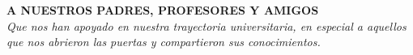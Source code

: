 \chapter*{}
\thispagestyle{empty}
\begin{flushright}
	\vfill
	\textbf{A NUESTROS PADRES, PROFESORES Y AMIGOS}\\
	\textit{Que nos han apoyado en nuestra trayectoria universitaria, en especial a aquellos\\ que nos abrieron las puertas y compartieron sus conocimientos.}
	\vfill
\end{flushright}

\begin{comment}


\chapter*{Agradecimientos}
\vskip 1cm

\paragraph{Nuestros Padres}

Por su amor, trabajo y sacrificio en todos estos años, gracias a ustedes hemos logrado llegar hasta aquí y convertirnos en lo que somos. Ha sido un orgullo y privilegio ser sus hijos, son los mejores padres.
\newline

\paragraph{Dra. Anamim V. Wong.}

Asesora de tesis, deseamos reconocer su valiosa guía, trabajo y dedicación permanente y continua al presente trabajo, así como sus sugerencias y observaciones, siempre inteligentes y oportunas.
\newline

\paragraph{Dra. Jehiely Belem H. C.  \& Ing. Rosel Muñoz López}

Por todas sus aportaciones para el desarrollo de esta tesis, así como reconocer todos los conocimientos que han logrado transmitirnos en las innumerables horas que hemos pasado juntos trabajando en los últimos años, siempre les estaremos agradecidos.
\newline

\paragraph{Nosotros}

Por proteger al mundo de la devastación, por unir a los pueblos dentro de nuestra nación, por denunciar los males de la verdad y el amor, por extender nuestro reino hasta las estrellas. 
\newline

\paragraph{Stack Overflow}
A la gente hermosa de la comunidad.
\end{comment}